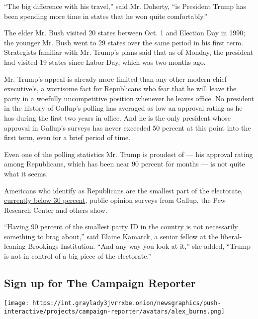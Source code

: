 ``The big difference with his travel,'' said Mr. Doherty, ``is President
Trump has been spending more time in states that he won quite
comfortably.''

The elder Mr. Bush visited 20 states between Oct. 1 and Election Day in
1990; the younger Mr. Bush went to 29 states over the same period in his
first term. Strategists familiar with Mr. Trump's plans said that as of
Monday, the president had visited 19 states since Labor Day, which was
two months ago.

Mr. Trump's appeal is already more limited than any other modern chief
executive's, a worrisome fact for Republicans who fear that he will
leave the party in a woefully uncompetitive position whenever he leaves
office. No president in the history of Gallup's polling has averaged as
low an approval rating as he has during the first two years in office.
And he is the only president whose approval in Gallup's surveys has
never exceeded 50 percent at this point into the first term, even for a
brief period of time.

Even one of the polling statistics Mr. Trump is proudest of --- his
approval rating among Republicans, which has been near 90 percent for
months --- is not quite what it seems.

Americans who identify as Republicans are the smallest part of the
electorate,
\href{https://news.gallup.com/poll/15370/party-affiliation.aspx}{currently
below 30 percent}, public opinion surveys from Gallup, the Pew Research
Center and others show.

``Having 90 percent of the smallest party ID in the country is not
necessarily something to brag about,'' said Elaine Kamarck, a senior
fellow at the liberal-leaning Brookings Institution. ``And any way you
look at it,'' she added, ``Trump is not in control of a big piece of the
electorate.''

\href{https://www.nytimes3xbfgragh.onion/interactive/2018/09/28/us/politics/the-campaign-reporter-ul.html?src=hpPromoHeadline}{}

\hypertarget{sign-up-for-the-campaign-reporter}{%
\subsection{Sign up for The Campaign
Reporter}\label{sign-up-for-the-campaign-reporter}}

\texttt{[image: https://int.graylady3jvrrxbe.onion/newsgraphics/push-interactive/projects/campaign-reporter/avatars/alex\_burns.png]}

